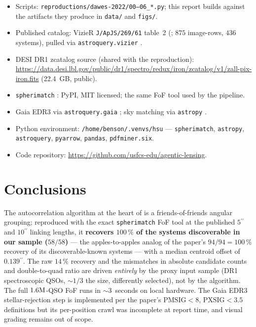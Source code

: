 \documentclass[11pt,letterpaper]{article}
\newcommand{\asec}{\ensuremath{^{\prime\prime}}}
\newcommand{\PMSIG}{\ensuremath{\mathrm{PMSIG}}}
\newcommand{\PXSIG}{\ensuremath{\mathrm{PXSIG}}}
\begin{document}
\begin{itemize}
\item Scripts: \texttt{reproductions/dawes-2022/00--06\_*.py}; this report
      builds against the artifacts they produce in \texttt{data/} and
      \texttt{figs/}.
\item Published catalog: VizieR \texttt{J/ApJS/269/61} table~2
      (\citealt{dawes2023quasars}; $875$ image-rows, $436$ systems), pulled
      via \texttt{astroquery.vizier} \autocite{astroquery2019}.
\item DESI DR1 zcatalog source (shared with the \citet{hsu2025pairwise}
      reproduction):
      \url{https://data.desi.lbl.gov/public/dr1/spectro/redux/iron/zcatalog/v1/zall-pix-iron.fits}
      (22.4~GB, public).
\item \texttt{spherimatch} \autocite{spherimatch}: PyPI, MIT licensed; the
      same FoF tool used by the \citet{hsu2025pairwise} pipeline.
\item Gaia EDR3 \autocite{gaiaedr3} via \texttt{astroquery.gaia}
      \autocite{astroquery2019}; sky matching via \texttt{astropy}
      \autocite{astropy2022}.
\item Python environment: \texttt{/home/benson/.venvs/hsu} ---
      \texttt{spherimatch}, \texttt{astropy}, \texttt{astroquery},
      \texttt{pyarrow}, \texttt{pandas}, \texttt{pdfminer.six}.
\item Code repository: \url{https://github.com/usfcs-edu/agentic-lensing}.
\end{itemize}

\section{Conclusions}

The autocorrelation algorithm at the heart of \citet{dawes2023quasars} is a
friends-of-friends angular grouping; reproduced with the exact
\texttt{spherimatch} FoF tool at the published $5\asec$ and $10\asec$
linking lengths, it \textbf{recovers $100\,\%$ of the systems discoverable
in our sample ($58/58$)} --- the apples-to-apples analog of the paper's
$94/94 = 100\,\%$ recovery of its discoverable-known systems --- with a
median centroid offset of $0.139\asec$. The raw $14\,\%$ recovery and the
mismatches in absolute candidate counts and double-to-quad ratio are driven
\emph{entirely} by the proxy input sample (DR1 spectroscopic QSOs,
${\sim}1/3$ the size, differently selected), not by the algorithm. The full
$1.6{\rm M}$-QSO FoF runs in ${\sim}3$~seconds on local hardware. The Gaia
EDR3 stellar-rejection step is implemented per the paper's $\PMSIG < 8$,
$\PXSIG < 3.5$ definitions but its per-position crawl was incomplete at
report time, and visual grading remains out of scope.
\end{document}
